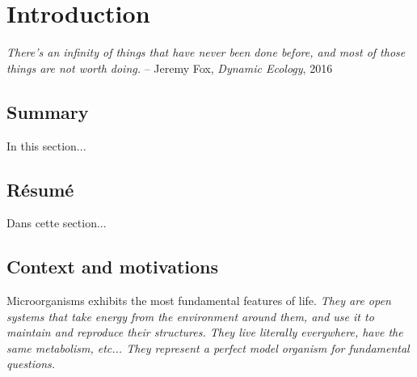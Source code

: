 \chapter{Introduction}

\textit{There's an infinity of things that have never been done before, and
most of those things are not worth doing.} -- Jeremy Fox, \textit{Dynamic Ecology}, 2016

\section*{Summary}

In this section...

\section*{Résumé}

Dans cette section...

\section{Context and motivations}

%

Microorganisms exhibits the most fundamental features of life. 
\textit{They are open systems that take energy from the environment around them, and use it to maintain and reproduce their structures.
They live literally everywhere, have the same metabolism, etc...
They represent a perfect model organism for fundamental questions.}

